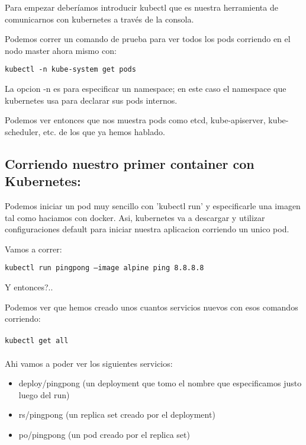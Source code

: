 \documentclass[11pt]{article} %
\begin{document}
Para empezar deberíamos introducir kubectl que es nuestra herramienta de comunicarnos con kubernetes a través de la consola.

Podemos correr un comando de prueba para ver todos los pods corriendo en el nodo master ahora mismo con:
\begin{center}
    \texttt{kubectl -n kube-system get pods}
\end{center}

La opcion -n es para especificar un namespace; en este caso el namespace que kubernetes usa para declarar sus pods internos.

Podemos ver entonces que nos muestra pods como etcd, kube-apiserver, kube-scheduler, etc. de los que ya hemos hablado.

\subsection{Corriendo nuestro primer container con Kubernetes:}

Podemos iniciar un pod muy sencillo con 'kubectl run' y especificarle una imagen tal como haciamos con docker. Asi, kubernetes va a descargar y utilizar configuraciones default para iniciar nuestra aplicacion corriendo un unico pod.

Vamos a correr:
\begin{center}
    \texttt{kubectl run pingpong --image alpine ping 8.8.8.8}
\end{center}

Y entonces?.. 

Podemos ver que hemos creado unos cuantos servicios nuevos con esos comandos corriendo:\\ \\
    \texttt{kubectl get all} \\ \\

Ahi vamos a poder ver los siguientes servicios:
\begin{itemize}

	\item
	deploy/pingpong (un deployment que tomo el nombre que especificamos justo luego del run)
    
    \item
    rs/pingpong (un replica set creado por el deployment)
    
    \item
    po/pingpong (un pod creado por el replica set)
\end{itemize}
\end{document}
